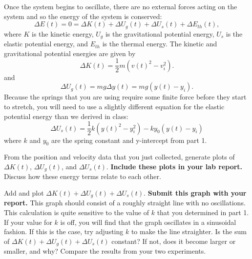 \documentclass[11pt,letterpaper]{article}
\begin{document}
Once the system begins to oscillate, there are no external forces acting on the system and so the energy of the system is conserved:
\begin{equation}
\Delta{E(t)}=0=\Delta{K(t)}+\Delta{U_g(t)}+\Delta{U_s(t)}+\Delta{E_{th}(t)},
\end{equation}
where $K$ is the kinetic energy, $U_g$ is the gravitational potential energy, $U_s$ is the elastic potential energy, and $E_{th}$ is the thermal energy. The kinetic and gravitational potential energies are given by 
\begin{equation}
\Delta{K(t)}=\frac{1}{2}m(v(t)^2-v_i^2).
\end{equation}
and 
\begin{equation}
\Delta{U_g(t)}=mg\Delta{y(t)}=mg(y(t)-y_i).
\end{equation}
Because the springs that you are using require some finite force before they start to stretch, you will need to use a slightly different equation for the elastic potential energy than we derived in class:
\begin{equation}
\Delta{U_s(t)}=\frac{1}{2}k(y(t)^2-y_i^2) - ky_0(y(t)-y_i)
\end{equation}
where $k$ and $y_0$ are the spring constant and y-intercept from part 1.

From the position and velocity data that you just collected, generate plots of $\Delta K(t)$, $\Delta U_g(t)$, and $\Delta U_s(t)$. \textbf{Include these plots in your lab report.} Discuss how these energy terms relate to each other. 

Add and plot $\Delta K(t)+\Delta U_g(t)+\Delta U_s(t)$. \textbf{Submit this graph with your report.} This graph should consist of a roughly straight line with no oscillations. This calculation is quite sensitive to the value of $k$ that you determined in part 1. If your value for $k$ is off, you will find that the graph oscillates in a sinusoidal fashion. If this is the case, try adjusting $k$ to make the line straighter. Is the sum of $\Delta K(t)+\Delta U_g(t)+\Delta U_s(t)$ constant? If not, does it become larger or smaller, and why? Compare the results from your two experiments.
\end{document}
